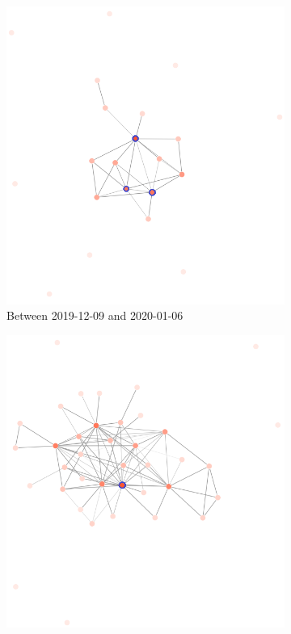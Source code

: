 \begin{figure}
    \centering
    \begin{subfigure}{0.49\textwidth}
        \centering
        \includegraphics[width=\textwidth]{figures/qualitative/core_periphery/numpy_before.png}
        \caption{Between 2019-12-09 and 2020-01-06}
        \label{fig:numpy-before}
    \end{subfigure}
    \hfill
    \begin{subfigure}{0.49\textwidth}
        \centering
        \includegraphics[width=\textwidth]{figures/qualitative/core_periphery/numpy_after.png}

\end{subfigure}
\end{figure}
